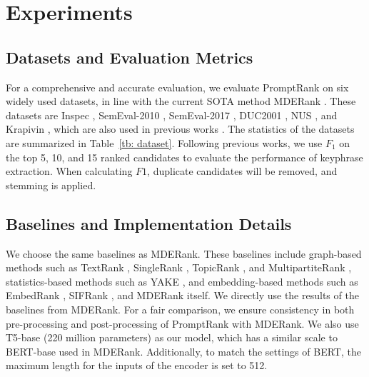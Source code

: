 \documentclass[11pt]{article}
\begin{document}
\section{Experiments}
\label{section: 4}







\subsection{Datasets and Evaluation Metrics}
For a comprehensive and accurate evaluation, we evaluate PromptRank on six widely used datasets, in line with the current SOTA method MDERank \cite{zhang-etal-2022-mderank}. These datasets are Inspec \cite{hulth-2003-improved}, SemEval-2010 \cite{kim-etal-2010-semeval}, SemEval-2017 \cite{augenstein-etal-2017-semeval}, DUC2001 \cite{wan2008single}, NUS \cite{10.1007/978-3-540-77094-7_41}, and Krapivin \cite{krapivin2009large}, which are also used in previous works \cite{bennani-smires-etal-2018-simple, 8954611, saxena-etal-2020-keygames, ding-luo-2021-attentionrank}. The statistics of the datasets are summarized in Table~\ref{tb: dataset}. Following previous works, we use $F_{1}$ on the top 5, 10, and 15 ranked candidates to evaluate the performance of keyphrase extraction. When calculating $F{1}$, duplicate candidates will be removed, and stemming is applied.

\subsection{Baselines and Implementation Details}
We choose the same baselines as MDERank. These baselines include graph-based methods such as TextRank \cite{mihalcea-tarau-2004-textrank}, SingleRank \cite{wan2008single}, TopicRank \cite{bougouin-etal-2013-topicrank}, and MultipartiteRank \cite{boudin-2018-unsupervised}, statistics-based methods such as YAKE \cite{campos2020yake}, and embedding-based methods such as EmbedRank \cite{bennani-smires-etal-2018-simple}, SIFRank \cite{8954611}, and MDERank\cite{zhang-etal-2022-mderank} itself. We directly use the results of the baselines from MDERank. For a fair comparison, we ensure consistency in both pre-processing and post-processing of PromptRank with MDERank. We also use T5-base (220 million parameters) as our model, which has a similar scale to BERT-base \cite{devlin-etal-2019-bert} used in MDERank. Additionally, to match the settings of BERT, the maximum length for the inputs of the encoder is set to 512.
\end{document}
